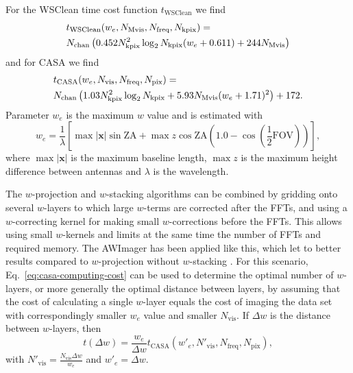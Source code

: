 \documentclass[useAMS,usenatbib]{mn2e}
\begin{document}
For the WSClean time cost function $t_\textrm{WSClean}$ we find 
\begin{align}\label{eq:wsclean-computing-cost}
& t_\textrm{WSClean} (w_e,N_\textrm{Mvis},N_\textrm{freq},N_\textrm{kpix}) = \\ \notag%
& N_\textrm{chan} \left( 0.452 N_\textrm{kpix}^2 \log_2 N_\textrm{kpix} (w_e + 0.611) + 244 N_\textrm{Mvis} \right)
\end{align}
and for CASA we find
\begin{align}\label{eq:casa-computing-cost}
& t_\textrm{CASA}(w_e,N_\textrm{vis},N_\textrm{freq},N_\textrm{pix}) = \\ \notag%
& N_\textrm{chan} \left(1.03 N_\textrm{kpix}^2 \log_2 N_\textrm{kpix} + 5.93 N_\textrm{Mvis} (w_e + 1.71)^2\right) + 172.
\label{eq:casa-computing-cost}%
\end{align}
Parameter $w_e$ is the maximum $w$ value and is estimated with
\begin{equation}
 w_e = \frac{1}{\lambda}\left[\max |\mathbf{x}| \sin \textrm{ZA} + \max z \cos \textrm{ZA} \left(1.0 - \cos(\frac{1}{2}\textrm{FOV})\right)\right],
\end{equation}
where $\max |\mathbf{x}|$ is the maximum baseline length, $\max z$ is the maximum height difference between antennas and $\lambda$ is the wavelength.

The $w$-projection and $w$-stacking algorithms can be combined by gridding onto several $w$-layers to which large $w$-terms are corrected after the FFTs, and using a $w$-correcting kernel for making small $w$-corrections before the FFTs. This allows using small $w$-kernels and limits at the same time the number of FFTs and required memory. The AWImager has been applied like this, which let to better results compared to $w$-projection without $w$-stacking \citep{awimager-2013}. For this scenario, Eq.~\eqref{eq:casa-computing-cost} can be used to determine the optimal number of $w$-layers, or more generally the optimal distance between layers, by assuming that the cost of calculating a single $w$-layer equals the cost of imaging the data set with correspondingly smaller $w_e$ value and smaller $N_\textrm{vis}$. If $\Delta w$ is the distance between $w$-layers, then 
\begin{equation}
t(\Delta w) = \frac{w_e}{\Delta w} t_\textrm{CASA}(w'_e,N'_\textrm{vis},N_\textrm{freq},N_\textrm{pix}),
\end{equation}
with $N'_\textrm{vis} = \frac{N_\textrm{vis}\Delta w}{w_e}$ and $w'_e = \Delta w$.
\end{document}
